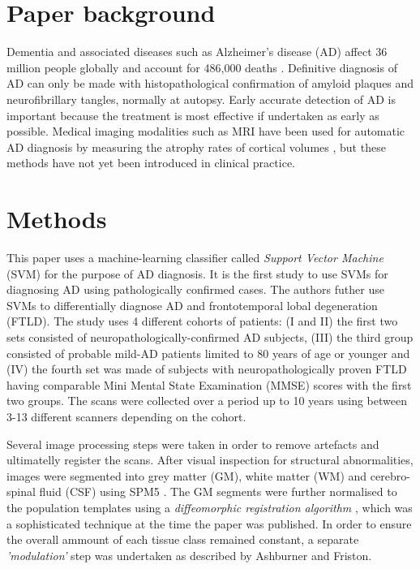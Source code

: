 \documentclass[11pt,a4paper,oneside]{report}
\begin{document}
\section*{Paper background}

Dementia and associated diseases such as Alzheimer's disease (AD) affect 36 million people globally \cite{world2012dementia} and account for 486,000 deaths \cite{lozano2013global}. Definitive diagnosis of AD can only be made with histopathological confirmation of amyloid plaques and neurofibrillary tangles, normally at autopsy. Early accurate detection of AD is important because the treatment is most effective if undertaken as early as possible. Medical imaging modalities such as MRI have been used for automatic AD diagnosis by measuring the atrophy rates of cortical volumes \cite{fox2004imaging,barnes2004differentiating,wahlund2005evidence}, but these methods have not yet been introduced in clinical practice.

\section*{Methods}

This paper uses a machine-learning classifier called \emph{Support Vector Machine} (SVM) for the purpose of AD diagnosis. It is the first study to use SVMs for diagnosing AD using pathologically confirmed cases. The authors futher use SVMs to differentially diagnose AD and frontotemporal lobal degeneration (FTLD). The study uses 4 different cohorts of patients: (I and II) the first two sets consisted of neuropathologically-confirmed AD subjects, (III) the third group consisted of probable mild-AD patients limited to 80 years of age or younger and (IV) the fourth set was made of subjects with neuropathologically proven FTLD having comparable Mini Mental State Examination (MMSE) scores with the first two groups. The scans were collected over a period up to 10 years using between 3-13 different scanners depending on the cohort.

Several image processing steps were taken in order to remove artefacts and ultimatelly register the scans. After visual inspection for structural abnormalities, images were segmented into grey matter (GM), white matter (WM) and cerebro-spinal fluid (CSF) using SPM5 \cite{SPM5}. The GM segments were further normalised to the population templates using a \emph{diffeomorphic registration algorithm} \cite{ashburner2007fast}, which was a sophisticated technique at the time the paper was published. In order to ensure the overall ammount of each tissue class remained constant, a separate \emph{'modulation'} step was undertaken as described by Ashburner and Friston. \cite{ashburner2000voxel}
\end{document}
